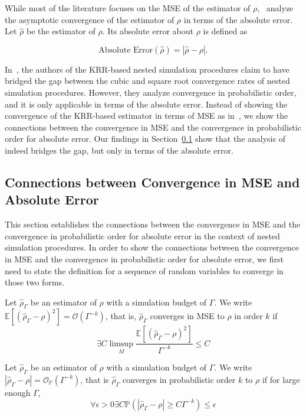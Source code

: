 While most of the literature focuses on the MSE of the estimator of $\rho$,~\cite{wang2022smooth} analyze the asymptotic convergence of the estimator of $\rho$ in terms of the absolute error.
Let $\hat{\rho}$ be the estimator of $\rho$. Its absolute error about $\rho$ is defined as

$$
\mbox{Absolute Error}\left(\hat{\rho}\right) = \left| \hat{\rho} - \rho \right|.
$$

In~\cite{wang2022smooth}, the authors of the KRR-based nested simulation procedures claim to have bridged the gap between the cubic and square root convergence rates of nested simulation procedures. However, they analyze convergence in probabilistic order, and it is only applicable in terms of the absolute error. 
Instead of showing the convergence of the KRR-based estimator in terms of MSE as in~\cite{gordy2010nested}, we show the connections between the convergence in MSE and the convergence in probabilistic order for absolute error.
Our findings in Section~\ref{sec1:connection-mse-absolute-error} show that the analysis of ~\cite{wang2022smooth} indeed bridges the gap, but only in terms of the absolute error.

\subsection{Connections between Convergence in MSE and Absolute Error} \label{sec1:connection-mse-absolute-error}

This section establishes the connections between the convergence in MSE and the convergence in probabilistic order for absolute error in the context of nested simulation procedures.
In order to show the connections between the convergence in MSE and the convergence in probabilistic order for absolute error, we first need to state the definition for a sequence of random variables to converge in those two forms.

\begin{definition}
    Let $\hat{\rho}_{\Gamma}$ be an estimator of $\rho$ with a simulation budget of $\Gamma$. 
    We write $\mathbb{E} \left[ \left(\hat{\rho}_{\Gamma} - \rho\right)^2 \right] = \mathcal{O} \left( \Gamma^{-k} \right)$, that is, $\hat{\rho}_{\Gamma}$ converges in MSE to $\rho$ in order $k$ if 
    $$
        \exists C \limsup_{M} \frac{\mathbb{E} \left[\left(\hat{\rho}_{\Gamma} - \rho\right)^2 \right]}{\Gamma^{-k}} \leq C
    $$
\end{definition}

\begin{definition}
    Let $\hat{\rho}_{\Gamma}$ be an estimator of $\rho$ with a simulation budget of $\Gamma$. 
    We write $|\hat{\rho}_{\Gamma} - \rho| = \mathcal{O}_{\mathbb{P}}(\Gamma^{-k})$, that is $\hat{\rho}_{\Gamma}$ converges in probabilistic order $k$ to $\rho$ if for large enough $\Gamma$,
    $$
        \forall \epsilon > 0 \exists C \mathbb{P} \left( \left| \hat{\rho}_{\Gamma} - \rho \right| \geq C \Gamma^{-k} \right) \leq \epsilon 
    $$
\end{definition}

